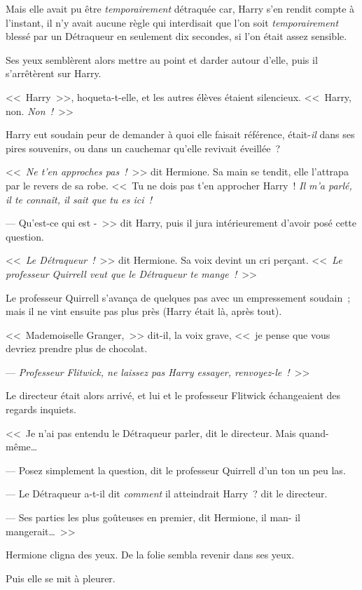 Mais elle avait pu être \emph{temporairement} détraquée car, Harry s'en rendit compte à l'instant, il n'y avait aucune règle qui interdisait que l'on soit \emph{temporairement} blessé par un Détraqueur en seulement dix secondes, si l'on était assez sensible.

Ses yeux semblèrent alors mettre au point et darder autour d'elle, puis il s'arrêtèrent sur Harry.

<<~Harry~>>, hoqueta-t-elle, et les autres élèves étaient silencieux. <<~Harry, non. \emph{Non~!}~>>

Harry eut soudain peur de demander à quoi elle faisait référence, était-\emph{il} dans ses pires souvenirs, ou dans un cauchemar qu'elle revivait éveillée~?

<<~\emph{Ne t'en approches pas~!}~>> dit Hermione. Sa main se tendit, elle l'attrapa par le revers de sa robe. <<~Tu ne dois pas t'en approcher Harry~! \emph{Il m'a parlé, il te connaît, il sait que tu es ici~!}

--- Qu'est-ce qui est -~>> dit Harry, puis il jura intérieurement d'avoir posé cette question.

<<~\emph{Le Détraqueur~!}~>> dit Hermione. Sa voix devint un cri perçant. <<~\emph{Le professeur Quirrell veut que le Détraqueur te mange~!}~>>

Le professeur Quirrell s'avança de quelques pas avec un empressement soudain~; mais il ne vint ensuite pas plus près (Harry était là, après tout).

<<~Mademoiselle Granger,~>> dit-il, la voix grave, <<~je pense que vous devriez prendre plus de chocolat.

--- \emph{Professeur Flitwick, ne laissez pas Harry essayer, renvoyez-le~!}~>>

Le directeur était alors arrivé, et lui et le professeur Flitwick échangeaient des regards inquiets.

<<~Je n'ai pas entendu le Détraqueur parler, dit le directeur. Mais quand-même…

--- Posez simplement la question, dit le professeur Quirrell d'un ton un peu las.

--- Le Détraqueur a-t-il dit \emph{comment} il atteindrait Harry~? dit le directeur.

--- Ses parties les plus goûteuses en premier, dit Hermione, il man- il mangerait…~>>

Hermione cligna des yeux. De la folie sembla revenir dans ses yeux.

Puis elle se mit à pleurer.

